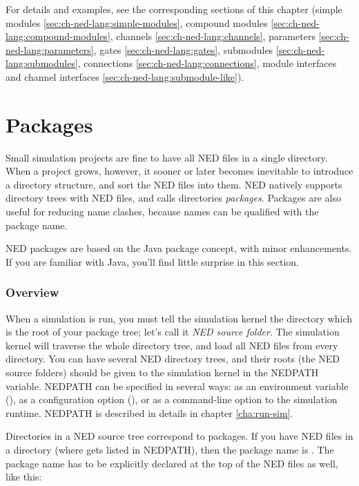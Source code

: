For details and examples, see the corresponding sections of this chapter
(simple modules \ref{sec:ch-ned-lang:simple-modules},
compound modules \ref{sec:ch-ned-lang:compound-modules},
channels \ref{sec:ch-ned-lang:channels},
parameters \ref{sec:ch-ned-lang:parameters},
gates \ref{sec:ch-ned-lang:gates},
submodules \ref{sec:ch-ned-lang:submodules},
connections \ref{sec:ch-ned-lang:connections},
module interfaces and channel interfaces \ref{sec:ch-ned-lang:submodule-like}).



\section{Packages}
\label{sec:ch-ned-lang:packages}

Small simulation projects are fine to have all NED files in a single
directory. When a project grows, however, it sooner or later becomes
inevitable to introduce a directory structure, and sort the NED files into
them. NED natively supports directory trees with NED files, and calls
directories \textit{packages}. Packages are also useful for reducing
name clashes, because names can be qualified with the package name.

\begin{note}
    NED packages are based on the Java package concept, with minor
    enhancements. If you are familiar with Java, you'll find little
    surprise in this section.
\end{note}

\subsubsection{Overview}

When a simulation is run, you must tell the simulation kernel the
directory which is the root of your package tree; let's call it
\textit{NED source folder}. The simulation kernel will traverse
the whole directory tree, and load all NED files from every directory.
You can have several NED directory trees, and their roots (the NED source
folders) should be given to the simulation kernel in the NEDPATH
variable. NEDPATH can be specified in several ways: as an environment
variable (), as a configuration option (),
or as a command-line option to the simulation runtime. NEDPATH is
described in details in chapter \ref{cha:run-sim}.

Directories in a NED source tree correspond to packages. If you have
NED files in a  directory (where 
gets listed in NEDPATH), then the package name is .
The package name has to be explicitly declared at the top of the NED
files as well, like this:

